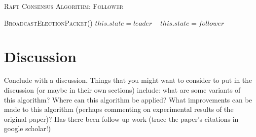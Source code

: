 \documentclass[11pt]{article}
\begin{document}
\begin{algorithm}\caption{\textsc{Raft Consensus Algorithm: Follower}}
 \begin{algorithmic}[1]
  
 	 
 \EndFunction
 \State \textsc{BroadcastElectionPacket()} 
  {}
	\State $this.state = leader $ 
 \EndFunction\
  {}
 	\State $this.state = follower $ 
 \EndFunction
\end{algorithmic}
\end{algorithm}

\section{Discussion}
Conclude with a discussion.  Things that you might want to consider to put in 
the discussion (or maybe in their own sections) include: what are some variants 
of this algorithm? Where can this algorithm be applied?  What improvements can 
be made to this algorithm (perhaps commenting on experimental results of the 
original paper)?  Has there been follow-up work (trace the paper's citations in 
google scholar!)
\end{document}
